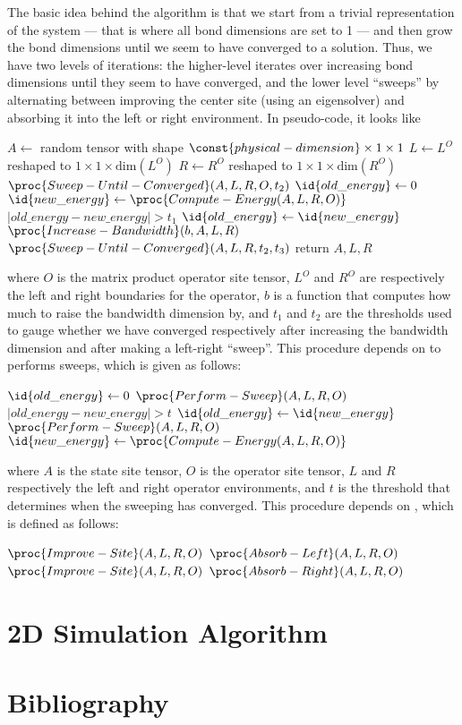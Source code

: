 \documentclass{article}
\begin{document}
The basic idea behind the algorithm is that we start from a trivial representation of the system --- that is where all bond dimensions are set to 1 --- and then grow the bond dimensions until we seem to have converged to a solution.  Thus, we have two levels of iterations:  the higher-level iterates over increasing bond dimensions until they seem to have converged, and the lower level ``sweeps'' by alternating between improving the center site (using an eigensolver) and absorbing it into the left or right environment.  In pseudo-code, it looks like
\begin{codebox}
\li $A \gets$ random tensor with shape $\const{physical-dimension}\times1\times 1$
\li $L \gets L^O$ reshaped to $1\times1\times\text{dim}(L^O)$
\li $R \gets R^O$ reshaped to $1\times1\times\text{dim}(R^O)$
\li $\proc{Sweep-Until-Converged}(A,L,R,O,t_2)$
\li $\id{old\_energy} \gets 0$
\li $\id{new\_energy} \gets  \proc{Compute-Energy(A,L,R,O)}$
\li \While $|old\_energy-new\_energy| > t_1$
\li     \Do
\li         $\id{old\_energy} \gets \id{new\_energy}$
\li         $\proc{Increase-Bandwidth}(b,A,L,R)$
\li         $\proc{Sweep-Until-Converged}(A,L,R,t_2,t_3)$
\End
\li return $A,L,R$
\end{codebox}
where $O$ is the matrix product operator site tensor, $L^O$ and $R^O$ are respectively the left and right boundaries for the operator, $b$ is a function that computes how much to raise the bandwidth dimension by, and $t_1$ and $t_2$ are the thresholds used to gauge whether we have converged respectively after increasing the bandwidth dimension and after making a left-right ``sweep''.  This procedure depends on  to performs sweeps, which is given as follows:
\begin{codebox}
\li $\id{old\_energy} \gets 0$
\li $\proc{Perform-Sweep}(A,L,R,O)$
\li \While $|old\_energy-new\_energy| > t$
\li     \Do
\li         $\id{old\_energy} \gets \id{new\_energy}$
\li         $\proc{Perform-Sweep}(A,L,R,O)$
\li         $\id{new\_energy} \gets  \proc{Compute-Energy(A,L,R,O)}$
\end{codebox}
where $A$ is the state site tensor, $O$ is the operator site tensor, $L$ and $R$ respectively the left and right operator environments, and $t$ is the threshold that determines when the sweeping has converged.  This procedure depends on , which is defined as follows:
\begin{codebox}
\li $\proc{Improve-Site}(A,L,R,O)$
\li $\proc{Absorb-Left}(A,L,R,O)$
\li $\proc{Improve-Site}(A,L,R,O)$
\li $\proc{Absorb-Right}(A,L,R,O)$
\end{codebox}

\part{2D Simulation Algorithm}
\label{2dsim}

\part*{Bibliography}



\end{document}
